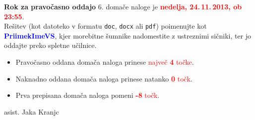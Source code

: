 \documentclass[a4paper,11pt]{article}
\newcommand{\assignment}{6}
\newcommand{\deadline}{nedelja, 24.\,11.\,2013, ob 23:55}
\newcounter{naloga}
\begin{document}
\vfill

\noindent \textbf{Rok za pravočasno oddajo} \assignment. domače naloge je \textcolor{red}{\textbf{\deadline}}. \\

\noindent Rešitev (kot datoteko v formatu \texttt{doc}, \texttt{docx} ali \texttt{pdf}) poimenujte kot \textcolor{blue}{\textbf{PriimekImeVS}}, kjer morebitne šumnike nadomestite z ustreznimi sičniki, ter jo oddajte preko spletne učilnice.

\begin{itemize}
\item Pravočasno oddana domača naloga prinese \textcolor{red}{največ \textbf{4} točke}.
\item Naknadno oddana domača naloga prinese natanko \textcolor{red}{\textbf{0} točk}.
\item Prva prepisana domača naloga pomeni \textcolor{red}{\textbf{-8} točk}.
\end{itemize}
\hfill asist. Jaka Kranjc
\end{document}
